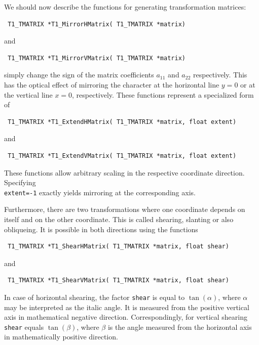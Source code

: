 We should now describe the functions for generating transformation matrices:
\precorr
\begin{verbatim}
 T1_TMATRIX *T1_MirrorHMatrix( T1_TMATRIX *matrix)
\end{verbatim}\postcorr
and
\precorr
\begin{verbatim}
 T1_TMATRIX *T1_MirrorVMatrix( T1_TMATRIX *matrix)
\end{verbatim}\postcorr
simply change the sign of the matrix coefficients $a_{11}$ and $a_{22}$
respectively. This has the optical effect of mirroring the character at the
horizontal line $y=0$ or at the vertical line $x=0$, respectively. These
functions represent a specialized form of 
\precorr
\begin{verbatim}
 T1_TMATRIX *T1_ExtendHMatrix( T1_TMATRIX *matrix, float extent)
\end{verbatim}\postcorr
and
\precorr
\begin{verbatim}
 T1_TMATRIX *T1_ExtendVMatrix( T1_TMATRIX *matrix, float extent)
\end{verbatim}\postcorr
These functions allow arbitrary scaling in the respective coordinate
direction. Specifying \\
\verb+extent=-1+ exactly yields mirroring at the
corresponding axis. 

Furthermore, there are two transformations where one coordinate depends on
itself and on the other coordinate.  This is called shearing, slanting or also
obliqueing. It is possible in both directions using the functions 
\precorr
\begin{verbatim}
 T1_TMATRIX *T1_ShearHMatrix( T1_TMATRIX *matrix, float shear)
\end{verbatim}\postcorr
and
\precorr
\begin{verbatim}
 T1_TMATRIX *T1_ShearVMatrix( T1_TMATRIX *matrix, float shear)
\end{verbatim}\postcorr
In case of horizontal shearing, the factor \verb+shear+ is equal to
$\tan(\alpha)$, where $\alpha$ may be interpreted as the italic angle. It is
measured from the positive vertical axis in mathematical negative direction. 
Correspondingly, for vertical shearing \verb+shear+ equals $\tan(\beta)$,
where $\beta$ is the angle measured from the horizontal axis in mathematically
positive direction.

